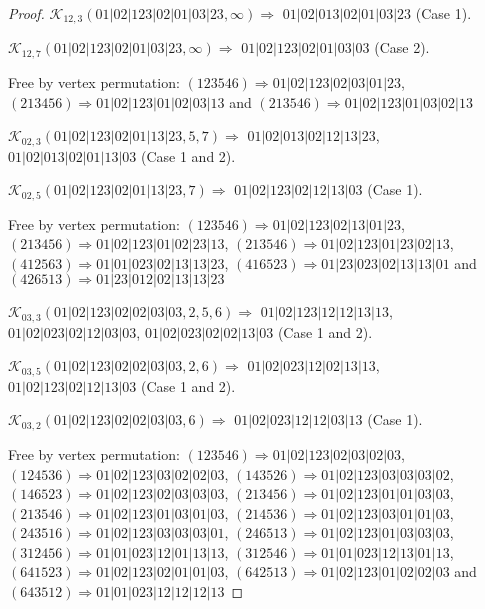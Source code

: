 \documentclass[12pt]{article}
\theoremstyle{plain}
\theoremstyle{definition}
\theoremstyle{remark}
\newcommand{\fancy}[1]{\mathcal{#1}}
\def\K{\fancy{K}}
\begin{document}
\begin{proof}
	$\K_{12,3}(01|02|123|02|01|03|23,\infty)\Rightarrow $ $01|02|013|02|01|03|23$ (Case 1).
	
	$\K_{12,7}(01|02|123|02|01|03|23,\infty)\Rightarrow $ $01|02|123|02|01|03|03$ (Case 2).
	
	
	
	Free by vertex permutation: $(1 2 3 5 4 6)\Rightarrow 01|02|123|02|03|01|23$, $(2 1 3 4 5 6)\Rightarrow 01|02|123|01|02|03|13$ and $(2 1 3 5 4 6)\Rightarrow 01|02|123|01|03|02|13$
	
	
	
	\bigskip
	
	$\K_{02,3}(01|02|123|02|01|13|23,5, 7)\Rightarrow $ $01|02|013|02|12|13|23$, $01|02|013|02|01|13|03$ (Case 1 and 2).
	
	$\K_{02,5}(01|02|123|02|01|13|23,7)\Rightarrow $ $01|02|123|02|12|13|03$ (Case 1).
	
	
	
	Free by vertex permutation: $(1 2 3 5 4 6)\Rightarrow 01|02|123|02|13|01|23$, $(2 1 3 4 5 6)\Rightarrow 01|02|123|01|02|23|13$, $(2 1 3 5 4 6)\Rightarrow 01|02|123|01|23|02|13$, $(4 1 2 5 6 3)\Rightarrow 01|01|023|02|13|13|23$, $(4 1 6 5 2 3)\Rightarrow 01|23|023|02|13|13|01$ and $(4 2 6 5 1 3)\Rightarrow 01|23|012|02|13|13|23$
	
	
	
	\bigskip
	
	$\K_{03,3}(01|02|123|02|02|03|03,2, 5, 6)\Rightarrow $ $01|02|123|12|12|13|13$, $01|02|023|02|12|03|03$, $01|02|023|02|02|13|03$ (Case 1 and 2).
	
	$\K_{03,5}(01|02|123|02|02|03|03,2, 6)\Rightarrow $ $01|02|023|12|02|13|13$, $01|02|123|02|12|13|03$ (Case 1 and 2).
	
	$\K_{03,2}(01|02|123|02|02|03|03,6)\Rightarrow $ $01|02|023|12|12|03|13$ (Case 1).
	
	
	
	Free by vertex permutation: $(1 2 3 5 4 6)\Rightarrow 01|02|123|02|03|02|03$, $(1 2 4 5 3 6)\Rightarrow 01|02|123|03|02|02|03$, $(1 4 3 5 2 6)\Rightarrow 01|02|123|03|03|03|02$, $(1 4 6 5 2 3)\Rightarrow 01|02|123|02|03|03|03$, $(2 1 3 4 5 6)\Rightarrow 01|02|123|01|01|03|03$, $(2 1 3 5 4 6)\Rightarrow 01|02|123|01|03|01|03$, $(2 1 4 5 3 6)\Rightarrow 01|02|123|03|01|01|03$, $(2 4 3 5 1 6)\Rightarrow 01|02|123|03|03|03|01$, $(2 4 6 5 1 3)\Rightarrow 01|02|123|01|03|03|03$, $(3 1 2 4 5 6)\Rightarrow 01|01|023|12|01|13|13$, $(3 1 2 5 4 6)\Rightarrow 01|01|023|12|13|01|13$, $(6 4 1 5 2 3)\Rightarrow 01|02|123|02|01|01|03$, $(6 4 2 5 1 3)\Rightarrow 01|02|123|01|02|02|03$ and $(6 4 3 5 1 2)\Rightarrow 01|01|023|12|12|12|13$
	

\end{proof}
\end{document}

